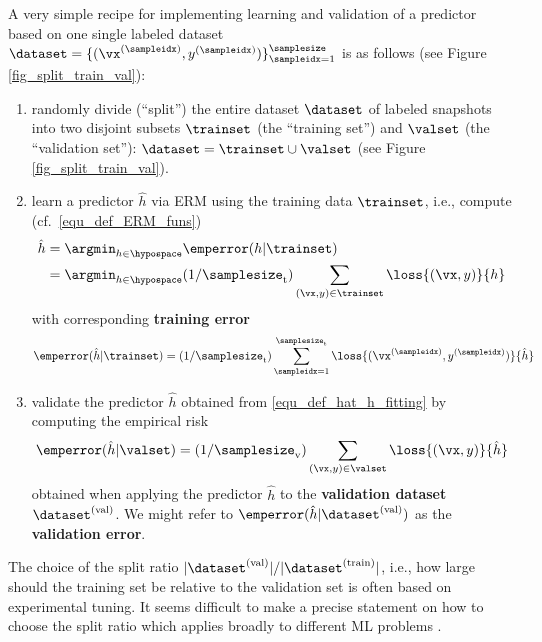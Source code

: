 \documentclass[12pt]{report}
\begin{document}
A very simple recipe for implementing learning and validation of a predictor based on one single labeled dataset 
$\dataset = \{(\vx^{(\sampleidx)},y^{(\sampleidx)})\}_{\sampleidx=1}^{\samplesize}$ is as follows (see Figure \ref{fig_split_train_val}): 
\begin{enumerate} 
\item randomly divide (``split'') the entire dataset $\dataset$ of labeled snapshots into two disjoint subsets 
$\trainset$ (the ``training set'') and $\valset$ (the ``validation set''): 
$\dataset = \trainset \cup \valset$ (see Figure \ref{fig_split_train_val}). 
\item learn a predictor $\hat{h}$ via ERM using the training data $\trainset$, i.e., compute (cf.\ \eqref{equ_def_ERM_funs}) 
\begin{align} 
\label{equ_def_hat_h_fitting}
\hat{h} & = \argmin_{h \in \hypospace} \emperror(h| \trainset) \nonumber \\
& = \argmin_{h \in \hypospace}  (1/\samplesize_{\rm t}) \sum_{(\vx,y) \in \trainset} \loss{(\vx,y)}{h} %
\end{align} 
with corresponding {\bf training error} 
\begin{equation} 
\label{equ_def_training_error_val}
\emperror(\hat{h}|\trainset)=  (1/\samplesize_{\rm t}) \sum_{\sampleidx=1}^{\samplesize_{\rm t}} \loss{(\vx^{(\sampleidx)},y^{(\sampleidx)})} {\hat{h}}  %
\end{equation}  
\item validate the predictor $\hat{h}$ obtained from \eqref{equ_def_hat_h_fitting} by computing the empirical risk 
\begin{equation} 
\label{equ_def_training_val_val}
\emperror(\hat{h}|\valset) = (1/\samplesize_{\rm v})  \sum_{(\vx,y) \in \valset} \loss{(\vx,y)} {\hat{h}}  %
\end{equation}  
obtained when applying the predictor $\hat{h}$ to the {\bf validation dataset} $\dataset^{(\rm val)}$. 
We might refer to $\emperror(\hat{h}| \dataset^{(\rm val)})$ as the {\bf validation error}. 
\end{enumerate} 
The choice of the split ratio $|\dataset^{(\rm val)}| / |\dataset^{(\rm train)}|$, i.e., how 
large should the training set be relative to the validation set is often based on experimental 
tuning. It seems difficult to make a precise statement on how to choose the split ratio 
which applies broadly to different ML problems \cite{Larsen1999}.
 
\end{document}
